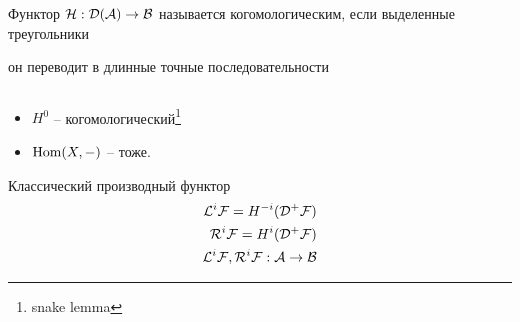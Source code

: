 \documentclass[../main.tex]{subfiles}
\begin{document}
 \begin{to_def}
Функтор $\mathcal{H}: \mathcal{D(A)}\rightarrow\mathcal{B}$ называется когомологическим, если выделенные треугольники  он переводит в длинные точные последовательности
\end{to_def}
\begin{to_ex}
$ $
\begin{itemize}
    \item $H^0$ -- когомологический\footnote{snake lemma}
    \item $\operatorname{Hom}(X, -)$ -- тоже.
\end{itemize}
\end{to_ex}
 \begin{to_def}
 \label{classicDerFunc}
Классический производный функтор 
\begin{align*}
    \mathcal{L}^{i}\mathcal{F} = H^{-i}(\mathcal{D^+ F})\\
    \mathcal{R}^{i}\mathcal{F} = H^{i}(\mathcal{D^+ F})\\
    \mathcal{L}^{i}\mathcal{F}, \mathcal{R}^{i}\mathcal{F}: \mathcal{A} \rightarrow \mathcal{B}
\end{align*}
\end{to_def}
\end{document}
